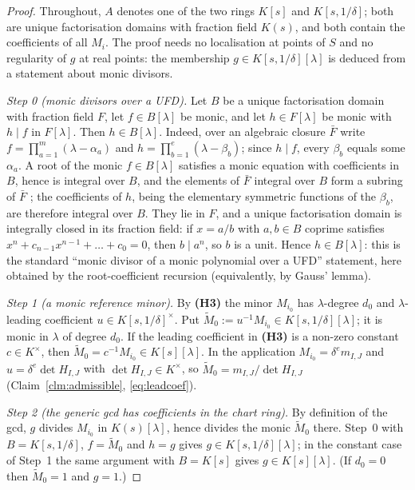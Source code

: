 \documentclass[journal]{IEEEtran}
\theoremstyle{plainn}
\theoremstyle{remark}
\begin{document}
\begin{proof}
Throughout, $A$ denotes one of the two rings $K[s]$ and $K[s,1/\delta]$; both are unique factorisation
domains with fraction field $K(s)$, and both contain the coefficients of all $M_i$. The proof needs no
localisation at points of $S$ and no regularity of $g$ at real points: the membership
$g\in K[s,1/\delta][\lambda]$ is deduced from a statement about monic divisors.

\emph{Step 0 (monic divisors over a UFD).} Let $B$ be a unique factorisation domain with fraction field
$F$, let $f\in B[\lambda]$ be monic, and let $h\in F[\lambda]$ be monic with $h\mid f$ in $F[\lambda]$. Then
$h\in B[\lambda]$. Indeed, over an algebraic closure $\bar F$ write
$f=\prod_{a=1}^{m}(\lambda-\alpha_a)$ and $h=\prod_{b=1}^{e}(\lambda-\beta_b)$; since $h\mid f$, every
$\beta_b$ equals some $\alpha_a$. A root of the monic $f\in B[\lambda]$ satisfies a monic equation with
coefficients in $B$, hence is integral over $B$, and the elements of $\bar F$ integral over $B$ form a
subring of $\bar F$ \cite[Prop.~5.1]{am69}; the coefficients of $h$, being the elementary symmetric
functions of the $\beta_b$, are therefore integral over $B$. They lie in $F$, and a unique factorisation
domain is integrally closed in its fraction field: if $x=a/b$ with $a,b\in B$ coprime satisfies
$x^n+c_{n-1}x^{n-1}+\dots+c_0=0$, then $b\mid a^n$, so $b$ is a unit. Hence $h\in B[\lambda]$: this is the
standard ``monic divisor of a monic polynomial over a UFD'' statement, here obtained by the root-coefficient
recursion (equivalently, by Gauss' lemma).

\emph{Step 1 (a monic reference minor).} By \textbf{(H3)} the minor $M_{i_0}$ has $\lambda$-degree $d_0$ and
$\lambda$-leading coefficient $u\in K[s,1/\delta]^{\times}$. Put
$\tilde M_0:=u^{-1}M_{i_0}\in K[s,1/\delta][\lambda]$; it is monic in $\lambda$ of degree $d_0$. If the
leading coefficient in \textbf{(H3)} is a non-zero constant $c\in K^{\times}$, then
$\tilde M_0=c^{-1}M_{i_0}\in K[s][\lambda]$. In the application $M_{i_0}=\delta^{e}m_{I,J}$ and
$u=\delta^{e}\det H_{I,J}$ with $\det H_{I,J}\in K^{\times}$, so $\tilde M_0=m_{I,J}/\det H_{I,J}$
(Claim~\ref{clm:admissible}, \eqref{eq:leadcoef}).

\emph{Step 2 (the generic gcd has coefficients in the chart ring).} By definition of the gcd, $g$ divides
$M_{i_0}$ in $K(s)[\lambda]$, hence divides the monic $\tilde M_0$ there. Step~0 with
$B=K[s,1/\delta]$, $f=\tilde M_0$ and $h=g$ gives $g\in K[s,1/\delta][\lambda]$; in the constant case of
Step~1 the same argument with $B=K[s]$ gives $g\in K[s][\lambda]$. (If $d_0=0$ then $\tilde M_0=1$ and
$g=1$.)


\end{proof}
\end{document}
